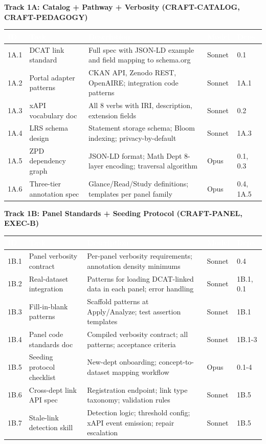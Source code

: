 \documentclass[11pt,letterpaper]{article}
\newcommand{\tableheader}[1]{\textbf{\sffamily\textcolor{white}{#1}}}
\begin{document}
\textbf{Track 1A: Catalog + Pathway + Verbosity (CRAFT-CATALOG, CRAFT-PEDAGOGY)}

\begin{center}
\begin{tabularx}{\textwidth}{L{1cm}L{3.5cm}XC{1.5cm}C{1.2cm}}
\toprule
{}
\tableheader{ID} & \tableheader{Task} & \tableheader{Description} & \tableheader{Model} & \tableheader{Deps} \\
\midrule
1A.1 & DCAT link standard & Full spec with JSON-LD example and field mapping to schema.org & Sonnet & 0.1 \\
1A.2 & Portal adapter patterns & CKAN API, Zenodo REST, OpenAIRE; integration code patterns & Sonnet & 1A.1 \\
1A.3 & xAPI vocabulary doc & All 8 verbs with IRI, description, extension fields & Sonnet & 0.2 \\
1A.4 & LRS schema design & Statement storage schema; Bloom indexing; privacy-by-default & Sonnet & 1A.3 \\
1A.5 & ZPD dependency graph & JSON-LD format; Math Dept 8-layer encoding; traversal algorithm & Opus & 0.1, 0.3 \\
1A.6 & Three-tier annotation spec & Glance/Read/Study definitions; templates per panel family & Opus & 0.4, 1A.5 \\
\bottomrule
\end{tabularx}
\end{center}

\textbf{Track 1B: Panel Standards + Seeding Protocol (CRAFT-PANEL, EXEC-B)}

\begin{center}
\begin{tabularx}{\textwidth}{L{1cm}L{3.5cm}XC{1.5cm}C{1.2cm}}
\toprule
{}
\tableheader{ID} & \tableheader{Task} & \tableheader{Description} & \tableheader{Model} & \tableheader{Deps} \\
\midrule
1B.1 & Panel verbosity contract & Per-panel verbosity requirements; annotation density minimums & Sonnet & 0.4 \\
1B.2 & Real-dataset integration & Patterns for loading DCAT-linked data in each panel; error handling & Sonnet & 1B.1, 0.1 \\
1B.3 & Fill-in-blank patterns & Scaffold patterns at Apply/Analyze; test assertion templates & Sonnet & 1B.1 \\
1B.4 & Panel code standards doc & Compiled verbosity contract; all patterns; acceptance criteria & Sonnet & 1B.1-3 \\
1B.5 & Seeding protocol checklist & New-dept onboarding; concept-to-dataset mapping workflow & Opus & 0.1-4 \\
1B.6 & Cross-dept link API spec & Registration endpoint; link type taxonomy; validation rules & Sonnet & 1B.5 \\
1B.7 & Stale-link detection skill & Detection logic; threshold config; xAPI event emission; repair escalation & Sonnet & 1B.5 \\
\bottomrule
\end{tabularx}
\end{center}
\end{document}
